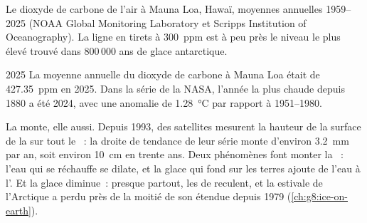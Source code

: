 \begin{omfigure}

{\small Le dioxyde de carbone de l'air à Mauna Loa, Hawaï, moyennes
annuelles 1959--2025 (NOAA Global Monitoring Laboratory et Scripps
Institution of Oceanography). La ligne en tirets à \qty{300}{ppm} est à
peu près le niveau le plus élevé trouvé dans 800\,000 ans de glace
antarctique.}
\label{fig:g9:climate-past-and-present:co2}
\end{omfigure}

\begin{dated}{2025}
La moyenne annuelle du dioxyde de carbone à Mauna Loa était de
\qty{427.35}{ppm} en 2025. Dans la série de la NASA, l'année la plus
chaude depuis 1880 a été 2024, avec une anomalie de
\qty{1.28}{\degreeCelsius} par rapport à 1951--1980.
\end{dated}

La  monte, elle aussi. Depuis 1993, des satellites mesurent la hauteur
de la surface de la  sur tout le ~: la droite de tendance de leur
série monte d'environ \qty{3.2}{mm} par an, soit environ \qty{10}{cm} en
trente ans. Deux phénomènes font monter la ~: l'eau qui se réchauffe se
dilate, et la glace qui fond sur les terres ajoute de l'eau à l'. Et
la glace diminue~: presque partout, les  de  reculent, et
la  estivale de l'Arctique a perdu près de la moitié de son
étendue depuis 1979 (\cref{ch:g8:ice-on-earth}).

